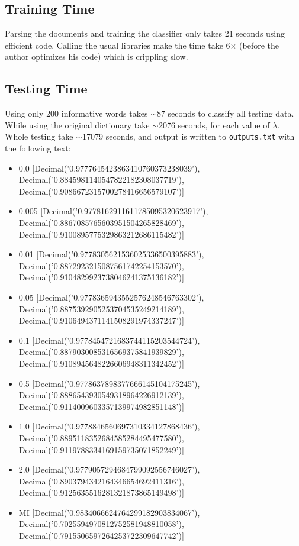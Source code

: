 \documentclass{article}
\begin{document}
\subsection*{Training Time}
Parsing the documents and training the classifier only takes 21 seconds using efficient code. Calling the usual libraries make the time take 6$\times$ (before the author optimizes his code) which is crippling slow.

\subsection*{Testing Time}
Using only 200 informative words takes $\sim$87 seconds to classify all testing data. While using the original dictionary take $\sim$2076 seconds, for each value of $\lambda$. Whole testing take $\sim$17079 seconds, and output is written to \texttt{outputs.txt} with the following text:

\begin{itemize}
	\item 0.0 [Decimal('0.9777645423863410760373238039'), Decimal('0.8845981140547822182308037719'), Decimal('0.9086672315700278416656579107')]
	\item 0.005 [Decimal('0.9778162911611785095320623917'), Decimal('0.8867085765603951504265828469'), Decimal('0.9100895775329863212686115482')]
	\item 0.01 [Decimal('0.9778305621536025336500395883'), Decimal('0.8872923215087561742254153570'), Decimal('0.9104829923738046241375136182')]
	\item 0.05 [Decimal('0.9778365943552576248546763302'), Decimal('0.8875392905253704535249214189'), Decimal('0.9106494371141508291974337247')]
	\item 0.1 [Decimal('0.9778454721683744115203544724'), Decimal('0.8879030085316569375841939829'), Decimal('0.9108945648226606948311342452')]
	\item 0.5 [Decimal('0.9778637898377666145104175245'), Decimal('0.8886543930549318964226912139'), Decimal('0.9114009603357139974982851148')]
	\item 1.0 [Decimal('0.9778846560697310334127868436'), Decimal('0.8895118352684585284495477580'), Decimal('0.9119788334169159735071852249')]
	\item 2.0 [Decimal('0.9779057294684799092556746027'), Decimal('0.8903794342164346654692411316'), Decimal('0.9125635516281321873865149498')]
	\item MI [Decimal('0.9834066624764299182903834067'), Decimal('0.7025594970812752581948810058'), Decimal('0.7915506597264253722309647742')]
\end{itemize}
\end{document}
